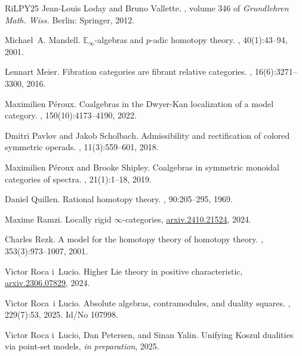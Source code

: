 \documentclass[a4paper,12pt]{amsart}
\theoremstyle{plain}
\theoremstyle{definition}
\theoremstyle{remark}
\begin{document}
\begin{thebibliography}{RiLPY25}
Jean-Louis Loday and Bruno Vallette.
, volume 346 of {\em Grundlehren Math. Wiss.}
\newblock Berlin: Springer, 2012.

Michael~A. Mandell.
\newblock $\mathbb{E}_\infty$-algebras and $p$-adic homotopy theory.
, 40(1):43--94, 2001.

Lennart Meier.
\newblock Fibration categories are fibrant relative categories.
, 16(6):3271--3300, 2016.

Maximilien P{\'e}roux.
\newblock Coalgebras in the {Dwyer}-{Kan} localization of a model category.
, 150(10):4173--4190, 2022.

Dmitri Pavlov and Jakob Scholbach.
\newblock Admissibility and rectification of colored symmetric operads.
, 11(3):559--601, 2018.

Maximilien P{\'e}roux and Brooke Shipley.
\newblock Coalgebras in symmetric monoidal categories of spectra.
, 21(1):1--18, 2019.

Daniel Quillen.
\newblock Rational homotopy theory.
, 90:205--295, 1969.

Maxime Ramzi.
\newblock Locally rigid $\infty$-categories,
  \href{https://arxiv.org/abs/2410.21524}{arxiv.2410.21524}, 2024.

Charles Rezk.
\newblock A model for the homotopy theory of homotopy theory.
, 353(3):973--1007, 2001.

Victor {R}oca {i}~{L}ucio.
\newblock Higher {L}ie theory in positive characteristic,
  \href{https://arxiv.org/abs/2306.07829}{arxiv.2306.07829}, 2024.

Victor Roca~i Lucio.
\newblock Absolute algebras, contramodules, and duality squares.
, 229(7):53, 2025.
\newblock Id/No 107998.

Victor {R}oca {i}~{L}ucio, Dan Petersen, and Sinan Yalin.
\newblock Unifying {K}oszul dualities via point-set models, \textit{in
  preparation}, 2025.


\end{thebibliography}
\end{document}
